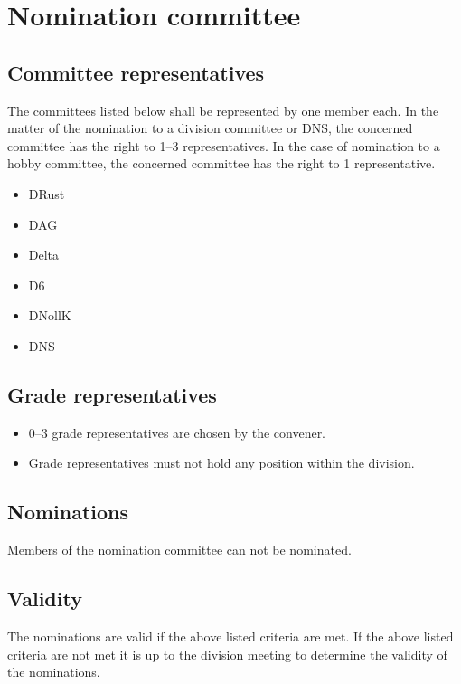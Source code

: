\section{Nomination committee}
\subsection{Committee representatives}
The committees listed below shall be represented by one member each. In the matter of the nomination to a division committee or DNS, the concerned committee has the right to 1--3 representatives. In the case of nomination to a hobby committee, the concerned committee has the right to 1 representative. 

\begin{itemize}
  \item DRust
  \item DAG 
  \item Delta 
  \item D6 
  \item DNollK
  \item DNS
\end{itemize}

\subsection{Grade representatives}
\begin{itemize}
  \item 0--3 grade representatives are chosen by the convener. 
  \item Grade representatives must not hold any position within the division. 
\end{itemize}
\subsection{Nominations}
Members of the nomination committee can not be nominated. 

\subsection{Validity}
The nominations are valid if the above listed criteria are met. If the above listed criteria are not met it is up to the division meeting to determine the validity of the nominations. 
